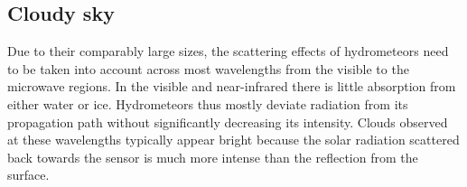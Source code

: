 %
%
%
%

\subsection{Cloudy sky}

Due to their comparably large sizes, the scattering effects of hydrometeors need
to be taken into account across most wavelengths from the visible to the
microwave regions. In the visible and near-infrared there is little absorption
from either water or ice. Hydrometeors thus mostly deviate radiation from its
propagation path without significantly decreasing its intensity. Clouds observed
at these wavelengths typically appear bright because the solar radiation
scattered back towards the sensor is much more intense than the reflection from
the surface.

